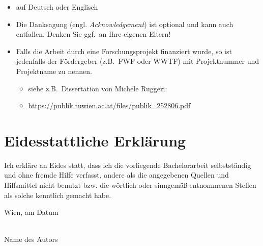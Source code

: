 \documentclass[a4paper,11pt,bibliography=totoc,listof=totoc,headinclude=true,cleardoublepage=empty,oneside]{scrbook}
\begin{document}
{\color{change}
\begin{itemize}
\item auf Deutsch oder Englisch
\item Die Danksagung (engl. {\em Acknowledgement}) ist optional und kann auch entfallen. Denken Sie ggf.\ an Ihre eigenen Eltern!

\item Falls die Arbeit durch eine Forschungsprojekt finanziert wurde, so ist jedenfalls der Fördergeber (z.B.\ FWF oder WWTF) mit Projektnummer und Projektname zu nennen.
\begin{itemize}
\item siehe z.B.\ Dissertation von Michele Ruggeri:
\item[] \href{https://publik.tuwien.ac.at/files/publik_252806.pdf}{\ttfamily https://publik.tuwien.ac.at/files/publik\_252806.pdf}
\end{itemize}

\end{itemize}
}

\cleardoublepage


\chapter*{Eidesstattliche Erkl\"arung}
\thispagestyle{empty}
\thispagestyle{empty}

\vspace*{2cm}

Ich erkl\"are an Eides statt, dass ich die vorliegende Bachelorarbeit selbstst\"andig und ohne fremde Hilfe verfasst, andere als die angegebenen Quellen und Hilfsmittel nicht benutzt bzw. die w\"ortlich oder sinngem\"a{\ss} entnommenen Stellen als solche kenntlich gemacht habe.

\vspace*{3cm}

\noindent
Wien, am {\color{change}Datum} %
%
\hfill 
%
\begin{minipage}[t]{5cm}
\centering
\underline{\hspace*{5cm}}\\
\small\color{change}Name des Autors
\end{minipage}
\end{document}
